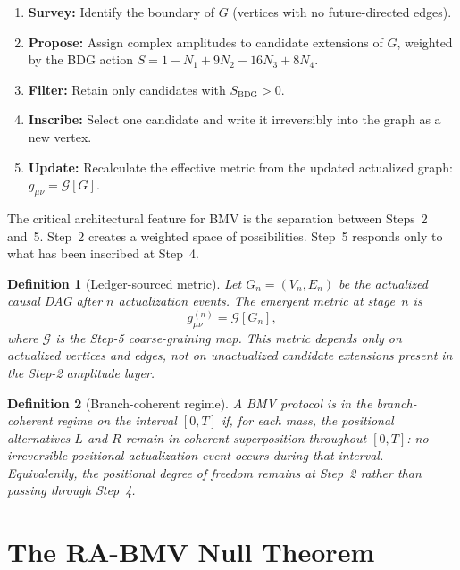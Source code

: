 \documentclass[12pt,a4paper]{article}
\newtheorem{definition}{Definition}[section]
\begin{document}
\begin{enumerate}[nosep]
\item \textbf{Survey:} Identify the boundary of $G$ (vertices with
no future-directed edges).
\item \textbf{Propose:} Assign complex amplitudes to candidate
extensions of $G$, weighted by the BDG action
$S = 1 - N_1 + 9N_2 - 16N_3 + 8N_4$.
\item \textbf{Filter:} Retain only candidates with
$S_{\mathrm{BDG}} > 0$.
\item \textbf{Inscribe:} Select one candidate and write it
irreversibly into the graph as a new vertex.
\item \textbf{Update:} Recalculate the effective metric from the
updated actualized graph: $g_{\mu\nu} = \mathcal{G}[G]$.
\end{enumerate}

The critical architectural feature for BMV is the separation between
Steps~2 and~5. Step~2 creates a weighted space of possibilities.
Step~5 responds only to what has been inscribed at Step~4.

\begin{definition}[Ledger-sourced metric]
\label{def:ledger}
Let $G_n = (V_n, E_n)$ be the actualized causal DAG after $n$
actualization events. The emergent metric at stage~$n$ is
\begin{equation}
g_{\mu\nu}^{(n)} = \mathcal{G}[G_n],
\end{equation}
where $\mathcal{G}$ is the Step-5 coarse-graining map. This metric
depends only on actualized vertices and edges, not on unactualized
candidate extensions present in the Step-2 amplitude layer.
\end{definition}

\begin{definition}[Branch-coherent regime]
\label{def:coherent}
A BMV protocol is in the \emph{branch-coherent regime} on the
interval $[0,T]$ if, for each mass, the positional alternatives
$L$ and $R$ remain in coherent superposition throughout $[0,T]$:
no irreversible positional actualization event occurs during that
interval. Equivalently, the positional degree of freedom remains at
Step~2 rather than passing through Step~4.
\end{definition}

\section{The RA-BMV Null Theorem}
\label{sec:theorem}
\end{document}
